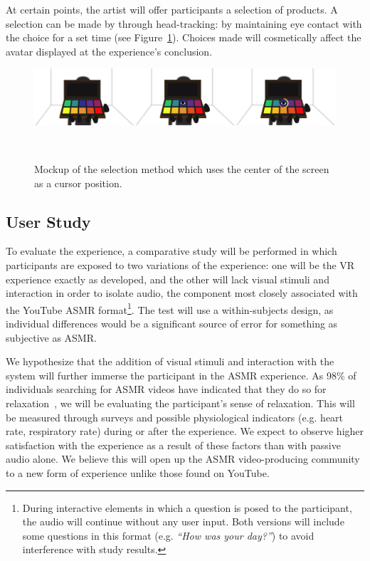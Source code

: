 \documentclass{sigchi}
\newcommand{\inlinequote}[1]{\textit{``#1''}}
\begin{document}
At certain points, the artist will offer participants a selection of products. A selection can be made by through head-tracking: by maintaining eye contact with the choice for a set time (see
Figure~\ref{fig:selection}). Choices made will cosmetically affect the avatar displayed at the experience's conclusion.

\begin{figure}[htb]
\centering
  \includegraphics[width=0.9\columnwidth]{figures/selection}
  \caption{Mockup of the selection method which uses the center of the screen as a cursor position.}~\label{fig:selection}
\end{figure}

\subsection{User Study}

To evaluate the experience, a comparative study will be performed in which participants are exposed to two variations of the experience: one will be the VR experience exactly as developed, and the other will lack visual stimuli and interaction in order to isolate audio, the component most closely associated with the YouTube ASMR format\footnote{During interactive elements in which a question is posed to the participant, the audio will continue without any user input. Both versions will include some questions in this format (e.g. \inlinequote{How was your day?}) to avoid interference with study results.}. The test will use a within-subjects design, as individual differences would be a significant source of error for something as subjective as ASMR.

We hypothesize that the addition of visual stimuli and interaction with the system will further immerse the participant in the ASMR experience. As 98\% of individuals searching for ASMR videos have indicated that they do so for relaxation~\cite{barratt2015autonomous}, we will be evaluating the participant's sense of relaxation. This will be measured through surveys and possible physiological indicators (e.g. heart rate, respiratory rate) during or after the experience. We expect to observe higher satisfaction with the experience as a result of these factors than with passive audio alone. We believe this will open up the ASMR video-producing community to a new form of experience unlike those found on YouTube.
\end{document}
